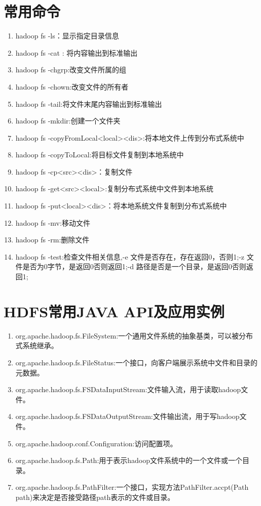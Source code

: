 \documentclass{article}
\begin{document}
	\section{常用命令}
	\begin{enumerate}
		\item hadoop fs -ls：显示指定目录信息
		\item hadoop fs -cat : 将内容输出到标准输出
		\item hadoop fs -chgrp:改变文件所属的组
		\item hadoop fs -chown:改变文件的所有者
		\item hadoop fs -tail:将文件末尾内容输出到标准输出
		\item hadoop fs -mkdir:创建一个文件夹
		\item hadoop fs -copyFromLocal<local><dis>:将本地文件上传到分布式系统中
		\item hadoop fs -copyToLocal:将目标文件复制到本地系统中
		\item hadoop fs -cp<src><dis>：复制文件
		\item hadoop fs -get<src><local>:复制分布式系统中文件到本地系统
		\item hadoop fs -put<local><dis>：将本地系统文件复制到分布式系统中
		\item hadoop fs -mv:移动文件
		\item hadoop fs -rm:删除文件
		\item hadoop fs -test:检查文件相关信息,-e 文件是否存在，存在返回0，否则1;-z 文件是否为0字节，是返回0否则返回1;-d 路径是否是一个目录，是返回0否则返回1;
	\end{enumerate}
	\section{HDFS常用JAVA API及应用实例}
	\begin{enumerate}
		\item org.apache.hadoop.fs.FileSystem:一个通用文件系统的抽象基类，可以被分布式系统继承。
		\item org.apache.hadoop.fs.FileStatus:一个接口，向客户端展示系统中文件和目录的元数据。
		\item org.apache.hadoop.fs.FSDataInputStream:文件输入流，用于读取hadoop文件。
		\item org.apache.hadoop.fs.FSDataOutputStream:文件输出流，用于写hadoop文件。
		\item org.apache.hadoop.conf.Configuration:访问配置项。
		\item org.apache.hadoop.fs.Path:用于表示hadoop文件系统中的一个文件或一个目录。
		\item org.apache.hadoop.fs.PathFilter:一个接口，实现方法PathFilter.accpt(Path path)来决定是否接受路径path表示的文件或目录。
	\end{enumerate}
	 
\end{document}
